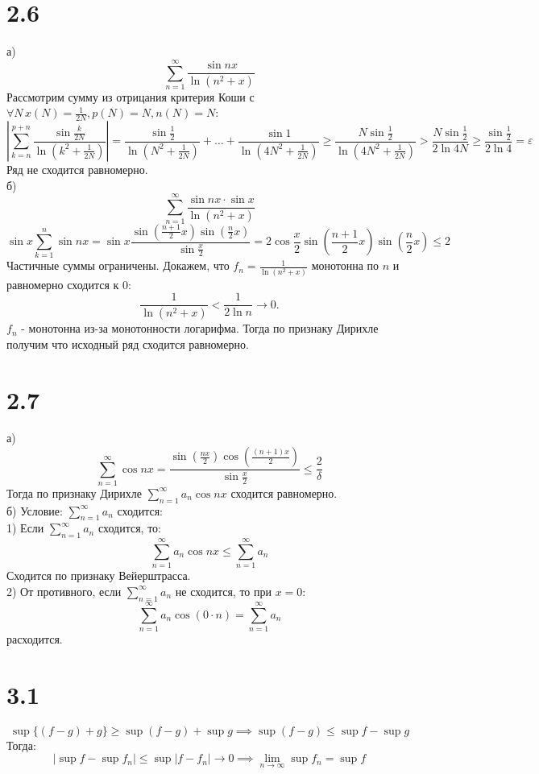 \documentclass[12pt]{article}
\begin{document}
\section{2.6}
а)
\[
    \sum_{n=1}^{\infty} \frac{\sin nx}{\ln (n^2 + x)}
\]
Рассмотрим сумму из отрицания критерия Коши с $\forall N \, x(N) = \frac{1}{2N}, p(N) = N, n(N) = N$:
\[
    \left| \sum_{k=n}^{p + n} \frac{\sin \frac{k}{2N}}{\ln (k^2 + \frac{1}{2N})} \right| = 
    \frac{\sin \frac{1}{2}}{\ln (N^2 + \frac{1}{2N})} + \dots + \frac{\sin 1}{\ln (4N^2 + \frac{1}{2N})} \geq 
    \frac{N \sin \frac{1}{2}}{\ln (4N^2 + \frac{1}{2N})} > \frac{N \sin \frac{1}{2}}{2 \ln 4N} \geq \frac{\sin \frac{1}{2}}{2\ln 4} = \varepsilon 
\] 
Ряд не сходится равномерно.\\
б)
\[
    \sum_{n=1}^{\infty} \frac{\sin nx \cdot \sin x}{\ln (n^2 + x)}
\]
\[
    \sin x \sum_{k=1}^{n} \sin nx = \sin x \frac{\sin \left( \frac{n+1}{2} x \right) \sin \left( \frac{n}{2}x \right) }{\sin \frac{x}{2}} = 
    2 \cos \frac{x}{2} \sin \left( \frac{n+1}{2} x \right) \sin \left( \frac{n}{2}x \right) \leq 2
\]
Частичные суммы ограничены. Докажем, что $f_n = \frac{1}{\ln (n^2 + x)}$
монотонна по $n$ и равномерно сходится к $0$:
\[
    \frac{1}{\ln (n^2 + x)} < \frac{1}{2 \ln n} \to 0.
\]
$f_n$ - монотонна из-за монотонности логарифма. 
Тогда по признаку Дирихле получим что исходный ряд сходится равномерно.
\section{2.7}
а) 
\[
    \sum_{n=1}^{\infty} \cos nx = \frac{\sin \left( \frac{nx}{2} \right)  \cos \left( \frac{(n+1)x}{2} \right) }{\sin \frac{x}{2}} \leq \frac{2}{\delta}
\]
Тогда по признаку Дирихле $\sum_{n=1}^{\infty} a_n \cos nx$ сходится равномерно. \\
б) 
Условие: $\sum_{n=1}^{\infty} a_n$ сходится: \\
1) Если $\sum_{n=1}^{\infty} a_n$ сходится, то: 
\[
    \sum_{n=1}^{\infty} a_n \cos nx \leq \sum_{n=1}^{\infty} a_n
\]
Сходится по признаку Вейерштрасса. \\
2) От противного, если $\sum_{n=1}^{\infty} a_n$ не сходится, то при $x = 0$: 
\[
    \sum_{n=1}^{\infty} a_n \cos (0 \cdot n) = \sum_{n=1}^{\infty} a_n
\]
расходится.
\section{3.1}
\[
    \sup \{(f - g) + g\} \geq \sup (f - g) + \sup g \implies \sup (f - g) \leq \sup f - \sup g
\]  
Тогда: 
\[
    \vert \sup f - \sup f_n \vert \leq \sup \vert f - f_n \vert \to 0 \implies \lim_{n \to \infty} \sup f_n = \sup f
\] 
\end{document}
